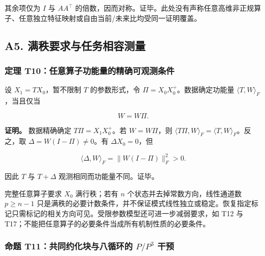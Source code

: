 \documentclass[11pt,a4paper]{article}
\begin{document}
其余项仅为 \(I\) 与 \(AA^\top\)
的倍数，因而对称。证毕。此处没有声称任意高维非正规算子、任意独立特征映射或自由当前/未来比均受同一证明覆盖。

\subsection{A5.
满秩要求与任务相容测量}\label{a5.-ux6ee1ux79e9ux8981ux6c42ux4e0eux4efbux52a1ux76f8ux5bb9ux6d4bux91cf}

\subsubsection{定理
T10：任意算子功能量的精确可观测条件}\label{ux5b9aux7406-t10ux4efbux610fux7b97ux5b50ux529fux80fdux91cfux7684ux7cbeux786eux53efux89c2ux6d4bux6761ux4ef6}

\par
\noindent\begin{minipage}{\linewidth}

设 \(X_1=TX_0\)，暂不限制 \(T\) 的参数形式，令
\(\Pi=X_0X_0^+\)。数据确定功能量 \(\langle T,W\rangle_F\)，当且仅当

\[
W=W\Pi.
\]

\end{minipage}\par

\par
\noindent\begin{minipage}{\linewidth}

\textbf{证明。} 数据精确确定 \(T\Pi=X_1X_0^+\)。若 \(W=W\Pi\)，则
\(\langle T\Pi,W\rangle_F=\langle T,W\rangle_F\)。反之，取
\(\Delta=W(I-\Pi)\ne0\)。有 \(\Delta X_0=0\)，但

\[
\langle\Delta,W\rangle_F=\|W(I-\Pi)\|_F^2>0.
\]

\end{minipage}\par

因此 \(T\) 与 \(T+\Delta\) 观测相同而功能量不同。证毕。

完整任意算子要求 \(X_0\) 满行秩；若有 \(n\)
个状态并去掉常数方向，线性通道数 \(p\ge n-1\)
只是满秩的必要计数条件，并不保证模式线性独立或稳定。恢复指定标记只需标记的相关方向可见。受限参数模型还可进一步减弱要求，如
T12 与 T17；不能把任意算子的必要条件当成所有机制性质的必要条件。

\subsubsection{\texorpdfstring{命题 T11：共同约化块与八循环的 \(P/P^3\)
干预}{命题 T11：共同约化块与八循环的 P/P\^{}3 干预}}\label{ux547dux9898-t11ux5171ux540cux7ea6ux5316ux5757ux4e0eux516bux5faaux73afux7684-pp3-ux5e72ux9884}
\end{document}
